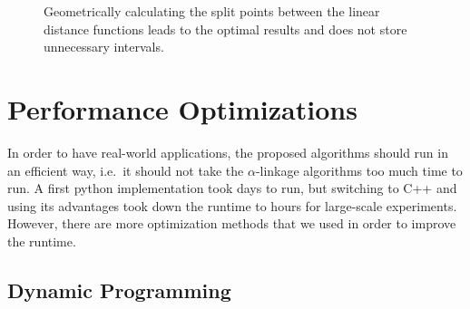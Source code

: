 \begin{figure}
    \centering
    \caption{Geometrically calculating the split points between the linear distance functions leads to the optimal results and does not store unnecessary intervals.}
    \label{fig:optimal}
\end{figure}

\section{Performance Optimizations}

In order to have real-world applications, the proposed algorithms should run in an efficient way, i.e.\ it should not take the $\alpha$-linkage algorithms too much time to run. A first python implementation took days to run, but switching to C++ and using its advantages took down the runtime to hours for large-scale experiments. However, there are more optimization methods that we used in order to improve the runtime.

\subsection{Dynamic Programming}

